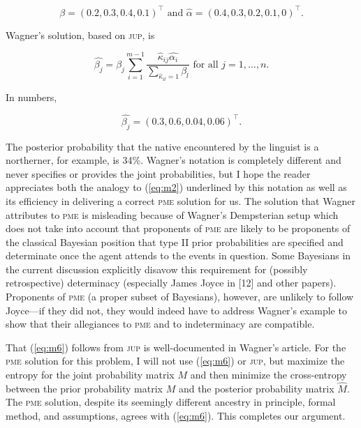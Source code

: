 \begin{equation}
  \label{eq:m5}
  \beta=(0.2,0.3,0.4,0.1)^{\intercal}\mbox{ and }\hat{\alpha}=(0.4,0.3,0.2,0.1,0)^{\intercal}.
\end{equation}

Wagner's solution, based on \textsc{jup}, is

\begin{equation}
  \label{eq:m6}
  \hat{\beta_{j}}=\beta_{j}\sum_{i=1}^{m-1}\frac{\hat{\kappa}_{ij}\hat{\alpha_{i}}}{\sum_{\hat{\kappa}_{il}=1}\beta_{l}}\mbox{ for all }j=1,\ldots,n.
\end{equation}

{\noindent}In numbers,

\begin{equation}
  \label{eq:m7}
  \hat{\beta_{j}}=(0.3,0.6,0.04,0.06)^{\intercal}.
\end{equation}

{\noindent}The posterior probability that the native encountered by
the linguist is a northerner, for example, is 34\%. Wagner's notation
is completely different and never specifies or provides the joint
probabilities, but I hope the reader appreciates both the analogy to
(\ref{eq:m2}) underlined by this notation as well as its efficiency in
delivering a correct \textsc{pme} solution for us. The solution that
Wagner attributes to \textsc{pme} is misleading because of Wagner's
Dempsterian setup which does not take into account that proponents of
\textsc{pme} are likely to be proponents of the classical Bayesian
position that type II prior probabilities are specified and
determinate once the agent attends to the events in question. Some
Bayesians in the current discussion explicitly disavow this
requirement for (possibly retrospective) determinacy (especially James
Joyce in [12] and other papers). Proponents of \textsc{pme} (a proper
subset of Bayesians), however, are unlikely to follow Joyce---if they
did not, they would indeed have to address Wagner's example to show
that their allegiances to \textsc{pme} and to indeterminacy are
compatible. 

That (\ref{eq:m6}) follows from \textsc{jup} is well-documented in
Wagner's article. For the \textsc{pme} solution for this problem, I
will not use (\ref{eq:m6}) or \textsc{jup}, but maximize the entropy
for the joint probability matrix $M$ and then minimize the
cross-entropy between the prior probability matrix $M$ and the
posterior probability matrix $\hat{M}$. The \textsc{pme} solution,
despite its seemingly different ancestry in principle, formal method,
and assumptions, agrees with (\ref{eq:m6}). This completes our
argument.


